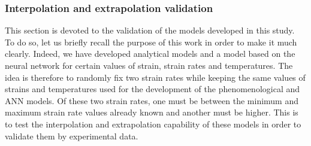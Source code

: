 \documentclass[twoside,english,1p,final,sort&compress]{elsarticle}
\theoremstyle{plain}
\begin{document}
\subsubsection{Interpolation and extrapolation validation\label{sec:Extrapolation}}
This section is devoted to the validation of the models developed in this study. To do so, let us briefly recall the purpose of this work in order to make it much clearly. Indeed, we have developed analytical models and a model based on the neural network for certain values of strain, strain rates and temperatures. The idea is therefore to randomly fix two strain rates while keeping the same values of strains and temperatures used for the development of the phenomenological and ANN models. Of these two strain rates, one must be between the minimum and maximum strain rate values already known and another must be higher. This is to test the interpolation and extrapolation capability of these models in order to validate them by experimental data.
 
\end{document}

